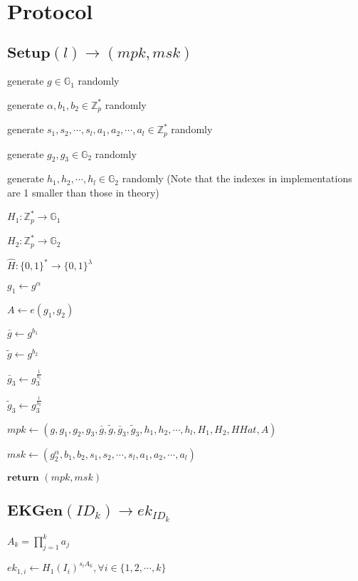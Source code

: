 \documentclass[a4paper]{article}
\begin{document}
\section{Protocol}

\subsection{$\textbf{Setup}(l) \rightarrow (\textit{mpk}, \textit{msk})$}

generate $g \in \mathbb{G}_1$ randomly

generate $\alpha, b_1, b_2 \in \mathbb{Z}_p^*$ randomly

generate $s_1, s_2, \cdots, s_l, a_1, a_2, \cdots, a_l \in \mathbb{Z}_p^*$ randomly

generate $g_2, g_3 \in \mathbb{G}_2$ randomly

generate $h_1, h_2, \cdots, h_l \in \mathbb{G}_2$ randomly (Note that the indexes in implementations are 1 smaller than those in theory)

$H_1:\mathbb{Z}_p^* \rightarrow \mathbb{G}_1$

$H_2:\mathbb{Z}_p^* \rightarrow \mathbb{G}_2$

$\hat{H}: \{0, 1\}^* \rightarrow \{0, 1\}^\lambda$

$g_1 \gets g^\alpha$

$A \gets e(g_1, g_2)$

$\bar{g} \gets g^{b_1}$

$\tilde{g} \gets g^{b_2}$

$\bar{g}_3 \gets g_3^{\frac{1}{b_1}}$

$\tilde{g}_3 \gets g_3^{\frac{1}{b_2}}$

$\textit{mpk} \gets (g, g_1, g_2, g_3, \bar{g}, \tilde{g}, \bar{g}_3, \tilde{g}_3, h_1, h_2, \cdots, h_l, H_1, H_2, HHat, A)$

$\textit{msk} \gets (g_2^\alpha, b_1, b_2, s_1, s_2, \cdots, s_l, a_1, a_2, \cdots, a_l)$

$\textbf{return }(\textit{mpk}, \textit{msk})$

\subsection{$\textbf{EKGen}(\textit{ID}_k) \rightarrow \textit{ek}_{\textit{ID}_k}$}

$A_k = \prod\limits_{j = 1}^k a_j$

$\textit{ek}_{1, i} \gets H_1(I_i)^{s_i A_k}, \forall i \in \{1, 2, \cdots, k\}$
\end{document}
